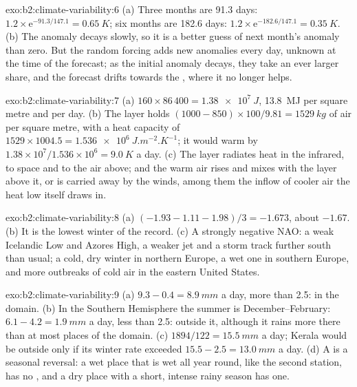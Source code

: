 \begin{solution}{exo:b2:climate-variability:6}
(a) Three months are 91.3 days: $1.2 \times \mathrm{e}^{-91.3/147.1} = \qty{0.65}{K}$; six months
are 182.6 days: $1.2 \times \mathrm{e}^{-182.6/147.1} = \qty{0.35}{K}$. (b) The anomaly decays
slowly, so it is a better guess of next month's anomaly than zero. But the random forcing adds
new anomalies every day, unknown at the time of the forecast; as the initial anomaly decays,
they take an ever larger share, and the forecast drifts towards the , where it no
longer helps.
\end{solution}

\begin{solution}{exo:b2:climate-variability:7}
(a) $160 \times 86\,400 = \qty{1.38e7}{J}$, \qty{13.8}{MJ} per square metre and per day. (b) The
layer holds $(1000 - 850) \times 100/9.81 = \qty{1529}{kg}$ of air per square metre, with a heat
capacity of $1529 \times 1004.5 = \qty{1.536e6}{J.m^{-2}.K^{-1}}$; it would warm by $1.38 \times
10^7/1.536 \times 10^6 = \qty{9.0}{K}$ a day. (c) The layer radiates heat in the infrared, to
space and to the air above; and the warm air rises and mixes with the layer above it, or is
carried away by the winds, among them the inflow of cooler air the heat low itself draws in.
\end{solution}

\begin{solution}{exo:b2:climate-variability:8}
(a) $(-1.93 - 1.11 - 1.98)/3 = -1.673$, about $-1.67$. (b) It is the lowest winter of the record.
(c) A strongly negative NAO: a weak Icelandic Low and Azores High, a weaker jet and a storm track
further south than usual; a cold, dry winter in northern Europe, a wet one in southern Europe,
and more outbreaks of cold air in the eastern United States.
\end{solution}

\begin{solution}{exo:b2:climate-variability:9}
(a) $9.3 - 0.4 = \qty{8.9}{mm}$ a day, more than 2.5: in the domain. (b) In the Southern Hemisphere
the summer is December--February: $6.1 - 4.2 = \qty{1.9}{mm}$ a day, less than 2.5: outside it,
although it rains more there than at most places of the domain. (c) $1894/122 = \qty{15.5}{mm}$ a
day; Kerala would be outside only if its winter rate exceeded $15.5 - 2.5 = \qty{13.0}{mm}$ a day.
(d) A  is a seasonal reversal: a wet place that is wet all year round, like the second
station, has no , and a dry place with a short, intense rainy season has one.
\end{solution}

